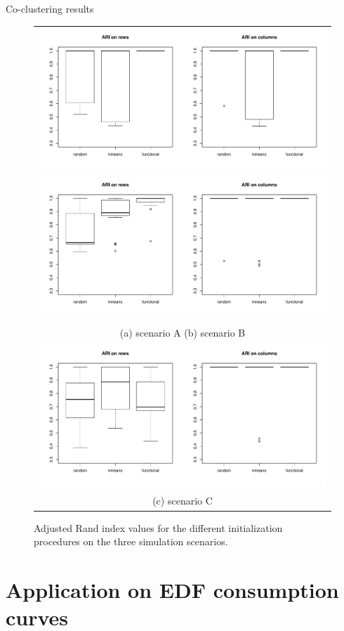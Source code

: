 \documentclass[10pt]{beamer}
\begin{document}
\begin{frame}{Co-clustering results}
\begin{figure}
\begin{centering}
\begin{tabular}{c}
\includegraphics[width=0.5\columnwidth]{images/simu-init-A}
\includegraphics[width=0.5\columnwidth]{images/simu-init-B}\tabularnewline
(a) scenario A \hspace{4cm}(b) scenario B
\tabularnewline
\includegraphics[width=0.5\columnwidth]{images/simu-init-C}\tabularnewline
(c) scenario C\tabularnewline
\end{tabular}
\par\end{centering}
\caption{\label{fig:simu-init}Adjusted Rand index values for the different
initialization procedures on the three simulation scenarios.}
\end{figure}
\end{frame}

\section{Application on EDF consumption curves}
\end{document}
